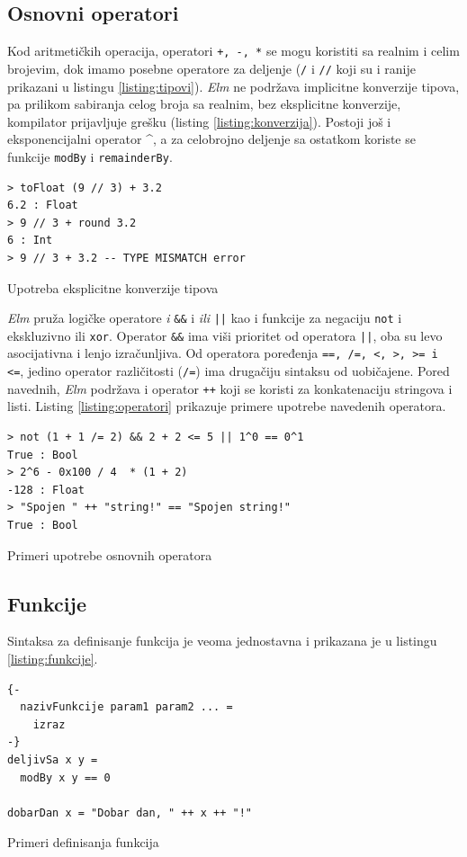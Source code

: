 \documentclass[12pt,oneside]{memoir}
\begin{document}
\subsection{Osnovni operatori}
Kod aritmetičkih operacija, operatori \texttt{+, -, *} se mogu koristiti sa realnim i 
celim brojevim, dok imamo posebne operatore za deljenje (\texttt{{/}} i \texttt{{//}} koji
su i ranije prikazani u listingu \ref{listing:tipovi}). \emph{Elm} ne podržava implicitne konverzije
tipova, pa prilikom sabiranja celog broja sa realnim, bez eksplicitne konverzije, kompilator
prijavljuje grešku (listing \ref{listing:konverzija}). Postoji još i eksponencijalni operator \^{},
a za celobrojno deljenje sa ostatkom koriste se funkcije \texttt{modBy} i \texttt{remainderBy}.
\begin{listing}[h]
\begin{verbatim}
> toFloat (9 // 3) + 3.2
6.2 : Float
> 9 // 3 + round 3.2
6 : Int
> 9 // 3 + 3.2 -- TYPE MISMATCH error
\end{verbatim}
\caption{Upotreba eksplicitne konverzije tipova}
\label{listing:konverzija}
\end{listing}

\emph{Elm} pruža logičke operatore \emph{i} \texttt{\&\&} i  \emph{ili} \texttt{||} kao i funkcije za negaciju 
\texttt{not} i ekskluzivno ili \texttt{xor}. Operator \texttt{\&\&} ima viši prioritet 
od operatora \texttt{||}, oba su levo asocijativna i lenjo izračunljiva. Od operatora poređenja 
\texttt{==, /=, <, >, >= i <=}, jedino operator različitosti (\texttt{/=}) ima drugačiju
sintaksu od uobičajene. Pored navednih, \emph{Elm} podržava i operator \texttt{++} koji se koristi za
konkatenaciju stringova i listi. Listing \ref{listing:operatori} prikazuje primere upotrebe 
navedenih operatora.

\begin{listing}[h]
\begin{verbatim}
> not (1 + 1 /= 2) && 2 + 2 <= 5 || 1^0 == 0^1 
True : Bool
> 2^6 - 0x100 / 4  * (1 + 2)
-128 : Float
> "Spojen " ++ "string!" == "Spojen string!"
True : Bool
\end{verbatim}
\caption{Primeri upotrebe osnovnih operatora}
\label{listing:operatori}
\end{listing}

\subsection{Funkcije}  
Sintaksa za definisanje funkcija je veoma jednostavna i prikazana je u listingu 
\ref{listing:funkcije}.
\begin{listing}[h]
\begin{verbatim}
{-
  nazivFunkcije param1 param2 ... =
    izraz  
-}
deljivSa x y =
  modBy x y == 0

dobarDan x = "Dobar dan, " ++ x ++ "!"  
\end{verbatim}
\caption{Primeri definisanja funkcija}
\label{listing:funkcije}
\end{listing}
\end{document}
